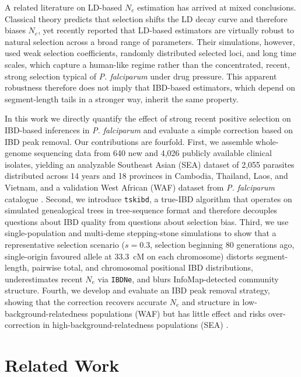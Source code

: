 A related literature on LD-based $N_e$ estimation has arrived at mixed conclusions. Classical theory predicts that selection shifts the LD decay curve and therefore biases $N_e$, yet \citet{novo2022ld} recently reported that LD-based estimators are virtually robust to natural selection across a broad range of parameters. Their simulations, however, used weak selection coefficients, randomly distributed selected loci, and long time scales, which capture a human-like regime rather than the concentrated, recent, strong selection typical of \textit{P. falciparum} under drug pressure. This apparent robustness therefore does not imply that IBD-based estimators, which depend on segment-length tails in a stronger way, inherit the same property.

In this work we directly quantify the effect of strong recent positive selection on IBD-based inferences in \textit{P. falciparum} and evaluate a simple correction based on IBD peak removal. Our contributions are fourfold. First, we assemble whole-genome sequencing data from 640 new and 4,026 publicly available clinical isolates, yielding an analyzable Southeast Asian (SEA) dataset of 2,055 parasites distributed across 14 years and 18 provinces in Cambodia, Thailand, Laos, and Vietnam, and a validation West African (WAF) dataset from \textit{P. falciparum} catalogue \citep{malariagen2021pf6,manske2012analysis}. Second, we introduce \texttt{tskibd}, a true-IBD algorithm that operates on simulated genealogical trees in tree-sequence format \citep{kelleher2018efficient,haller2019treeseq,baumdicker2022msprime} and therefore decouples questions about IBD quality from questions about selection bias. Third, we use single-population and multi-deme stepping-stone simulations \citep{haller2019slim,kelleher2016msprime} to show that a representative selection scenario ($s = 0.3$, selection beginning 80 generations ago, single-origin favoured allele at 33.3~cM on each chromosome) distorts segment-length, pairwise total, and chromosomal positional IBD distributions, underestimates recent $N_e$ via \texttt{IBDNe}, and blurs InfoMap-detected community structure. Fourth, we develop and evaluate an IBD peak removal strategy, showing that the correction recovers accurate $N_e$ and structure in low-background-relatedness populations (WAF) but has little effect and risks over-correction in high-background-relatedness populations (SEA) \citep{daniels2015modeling,verity2020diversity}.

\section{Related Work}

